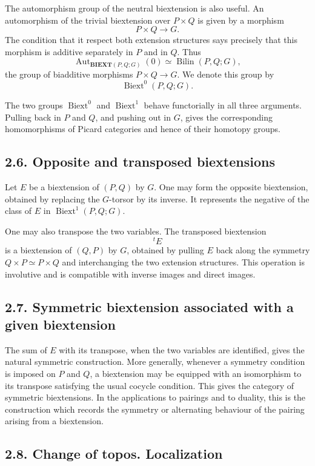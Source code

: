 \documentclass[11pt]{article}
\newcommand{\Biext}{\operatorname{Biext}}
\newcommand{\BIEXT}{\mathbf{BIEXT}}
\begin{document}
The automorphism group of the neutral biextension is also useful. An automorphism
of the trivial biextension over \(P\times Q\) is given by a morphism
\[
P\times Q\longrightarrow G.
\]
The condition that it respect both extension structures says precisely that this
morphism is additive separately in \(P\) and in \(Q\). Thus
\[
\operatorname{Aut}_{\BIEXT(P,Q;G)}(0)
        \simeq \operatorname{Bilin}(P,Q;G),
\]
the group of biadditive morphisms \(P\times Q\to G\). We denote this group by
\[
\Biext^0(P,Q;G).
\]

The two groups \(\Biext^0\) and \(\Biext^1\) behave functorially in all three
arguments. Pulling back in \(P\) and \(Q\), and pushing out in \(G\), gives the
corresponding homomorphisms of Picard categories and hence of their homotopy
groups.

\subsection*{2.6. Opposite and transposed biextensions}

Let \(E\) be a biextension of \((P,Q)\) by \(G\). One may form the opposite
biextension, obtained by replacing the \(G\)-torsor by its inverse. It represents
the negative of the class of \(E\) in \(\Biext^1(P,Q;G)\).

One may also transpose the two variables. The transposed biextension
\[
{}^tE
\]
is a biextension of \((Q,P)\) by \(G\), obtained by pulling \(E\) back along the
symmetry \(Q\times P\simeq P\times Q\) and interchanging the two extension
structures. This operation is involutive and is compatible with inverse images
and direct images.

\subsection*{2.7. Symmetric biextension associated with a given biextension}

The sum of \(E\) with its transpose, when the two variables are identified, gives
the natural symmetric construction. More generally, whenever a symmetry condition
is imposed on \(P\) and \(Q\), a biextension may be equipped with an isomorphism
to its transpose satisfying the usual cocycle condition. This gives the category
of symmetric biextensions. In the applications to pairings and to duality, this
is the construction which records the symmetry or alternating behaviour of the
pairing arising from a biextension.

\subsection*{2.8. Change of topos. Localization}
\end{document}
